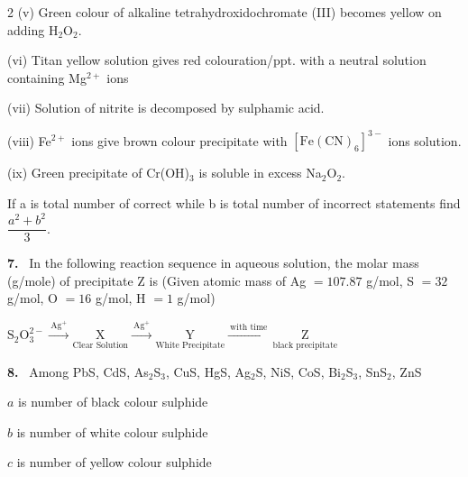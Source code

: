 \documentclass[10pt]{extarticle}
\newcommand{\qn}[1]{\par\smallskip\noindent\textbf{#1.}~}
\begin{document}
\begin{multicols}{2}
(v) Green colour of alkaline tetrahydroxidochromate (III) becomes yellow on adding H$_2$O$_2$.

(vi) Titan yellow solution gives red colouration/ppt. with a neutral solution containing Mg$^{2+}$ ions

(vii) Solution of nitrite is decomposed by sulphamic acid.

(viii) Fe$^{2+}$ ions give brown colour precipitate with $[\mathrm{Fe(CN)_6}]^{3-}$ ions solution.

(ix) Green precipitate of Cr(OH)$_3$ is soluble in excess Na$_2$O$_2$.

If a is total number of correct while b is total number of incorrect statements find $\dfrac{a^2+b^2}{3}$.
\qn{7} In the following reaction sequence in aqueous solution, the molar mass (g/mole) of precipitate Z is (Given atomic mass of Ag $=107.87$ g/mol, S $=32$ g/mol, O $=16$ g/mol, H $=1$ g/mol)

{\footnotesize $\mathrm{S_2O_3^{2-}}\xrightarrow{\ \mathrm{Ag^+}\ }\underset{\text{Clear Solution}}{\mathrm X}\xrightarrow{\ \mathrm{Ag^+}\ }\underset{\text{White Precipitate}}{\mathrm Y}\xrightarrow{\ \text{with time}\ }\underset{\text{black precipitate}}{\mathrm Z}$}
\qn{8} Among PbS, CdS, As$_2$S$_3$, CuS, HgS, Ag$_2$S, NiS, CoS, Bi$_2$S$_3$, SnS$_2$, ZnS

$a$ is number of black colour sulphide

$b$ is number of white colour sulphide

$c$ is number of yellow colour sulphide


\end{multicols}
\end{document}
